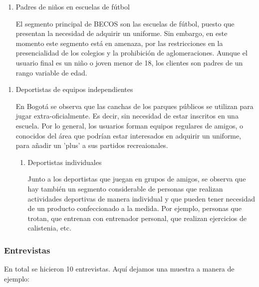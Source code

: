 \documentclass[11pt]{article}
\begin{document}
\begin{enumerate}
\item Padres de niños en escuelas de fútbol

El segmento principal de BECOS son
las escuelas de fútbol, puesto
que presentan la necesidad
de adquirir un uniforme.
Sin embargo, en este momento
este segmento está en amenaza,
por las restricciones en la
presencialidad de los colegios
y la prohibición de aglomeraciones.
Aunque el usuario final es un niño
o joven menor de 18, los clientes
son padres de un rango variable de
edad.
\end{enumerate}


\begin{enumerate}
\item Deportistas de equipos independientes 

En Bogotá se observa que las
canchas de los parques públicos se utilizan
para jugar extra-oficialmente. Es decir,
sin necesidad de estar inscritos en una
escuela. Por lo general, los usuarios
forman equipos regulares de amigos, o
conocidos del área que podrían estar
interesados en adquirir un uniforme,
para añadir un 'plus' a sus partidos
recreaionales.

\begin{enumerate}
\item Deportistas individuales

Junto a los deportistas que juegan en grupos
de amigos, se observa que hay también un
segmento considerable de personas que
realizan actividades deportivas de manera
individual y que pueden tener necesidad
de un producto confeccionado a la medida.
Por ejemplo, personas que trotan, que
entrenan con entrenador personal, que
realizan ejercicios de calistenia, etc.
\end{enumerate}
\end{enumerate}



\subsubsection{Entrevistas}
\label{sec:orgde70a25}
En total se hicieron 10 entrevistas. Aquí dejamos una
muestra a manera de ejemplo:
\end{document}
